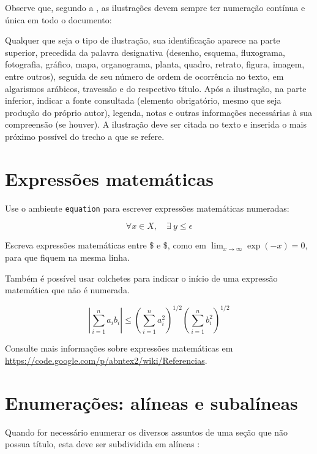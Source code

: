 Observe que, segundo a , as
ilustrações devem sempre ter numeração contínua e única em todo o documento:

\begin{citacao}
Qualquer que seja o tipo de ilustração, sua identificação aparece na parte
superior, precedida da palavra designativa (desenho, esquema, fluxograma,
fotografia, gráfico, mapa, organograma, planta, quadro, retrato, figura,
imagem, entre outros), seguida de seu número de ordem de ocorrência no texto,
em algarismos arábicos, travessão e do respectivo título. Após a ilustração, na
parte inferior, indicar a fonte consultada (elemento obrigatório, mesmo que
seja produção do próprio autor), legenda, notas e outras informações
necessárias à sua compreensão (se houver). A ilustração deve ser citada no
texto e inserida o mais próximo possível do trecho a que se
refere. \cite[seções 5.8]{NBR14724:2011}
\end{citacao}

\section{Expressões matemáticas}

Use o ambiente \texttt{equation} para escrever
expressões matemáticas numeradas:

\begin{equation}
  \forall x \in X, \quad \exists \: y \leq \epsilon
\end{equation}

Escreva expressões matemáticas entre \$ e \$, como em $ \lim_{x \to \infty}
\exp(-x) = 0 $, para que fiquem na mesma linha.

Também é possível usar colchetes para indicar o início de uma expressão
matemática que não é numerada.

\[
\left|\sum_{i=1}^n a_ib_i\right|
\le
\left(\sum_{i=1}^n a_i^2\right)^{1/2}
\left(\sum_{i=1}^n b_i^2\right)^{1/2}
\]

Consulte mais informações sobre expressões matemáticas em
\url{https://code.google.com/p/abntex2/wiki/Referencias}.

\section{Enumerações: alíneas e subalíneas}

Quando for necessário enumerar
os diversos assuntos de uma seção que não possua título, esta deve ser
subdividida em alíneas \cite[4.2]{NBR6024:2012}:

